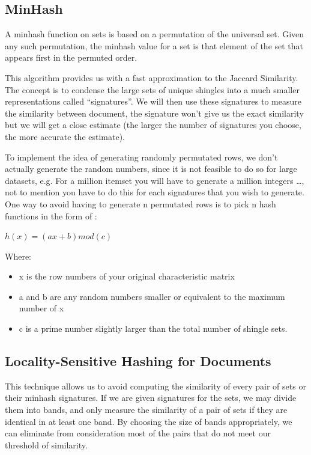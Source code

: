\documentclass[12pt]{article}
\begin{document}
\subsection{MinHash}

A minhash function on sets is based on a permutation of the universal set. Given any such permutation, the minhash value for a set is that element of the set that appears first in the permuted order. 

This algorithm provides us with a fast approximation to the Jaccard Similarity. The concept is to condense the large sets of unique shingles into a much smaller representations called ``signatures''. We will then use these signatures to measure the similarity between document, the signature won't give us the exact similarity but we will get a close estimate (the larger the number of signatures you choose, the more accurate the estimate).
\\ \medskip


To implement the idea of generating randomly permutated rows, we don’t actually generate the random numbers, since it is not feasible to do so for large datasets, e.g. For a million itemset you will have to generate a million integers …, not to mention you have to do this for each signatures that you wish to generate. One way to avoid having to generate n permutated rows is to pick n hash functions in the form of :
\medbreak
\begin{center}
$ h(x)=(ax+b) mod(c)$
\end{center}

Where: 
\begin{itemize}
\item x is the row numbers of your original characteristic matrix
\item a and b are any random numbers smaller or equivalent to the maximum number of x 
\item c is a prime number slightly larger than the total number of shingle sets. 
\end{itemize}

\subsection{Locality-Sensitive Hashing for Documents}
 This technique allows us to avoid computing the similarity of every pair of sets or their minhash signatures. If we are given signatures for the sets, we may divide them into bands, and only measure the similarity of a pair of sets if they are identical in at least one band. By choosing the size of bands appropriately, we can eliminate from consideration most of the pairs that do not meet our threshold of similarity.
 \medskip 
 \\
\end{document}
